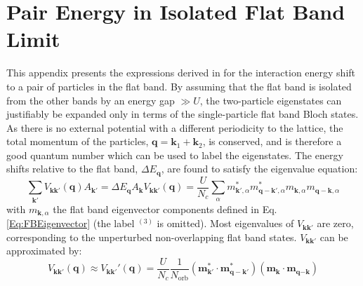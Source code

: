 \chapter{Pair Energy in Isolated Flat Band Limit}\label{App:Pair_Energy}

This appendix presents the expressions derived in \cite{Torma} for the interaction energy shift to a pair of particles in the flat band. By assuming that the flat band is isolated from the other bands by an energy gap $\gg U$, the two-particle eigenstates can justifiably be expanded only in terms of the single-particle flat band Bloch states. As there is no external potential with a different periodicity to the lattice, the total momentum of the particles, $\textbf{q}=\textbf{k}_1+\textbf{k}_2$, is conserved, and is therefore a good quantum number which can be used to label the eigenstates. The energy shifts relative to the flat band, $\Delta E_{\textbf{q}}$, are found to satisfy the eigenvalue equation:
\begin{subequations}\label{Eq:PairEnergy_Eigenvalue}
    \begin{equation}
        \sum_{\textbf{k}'}V_{\textbf{k}\textbf{k}'}(\textbf{q}) A_{\textbf{k}'}=\Delta E_{\textbf{q}}A_{\textbf{k}}
    \end{equation}
    \begin{equation}
        V_{\textbf{k}\textbf{k}'}(\textbf{q})=\frac{U}{N_c}\sum_{\alpha} m_{\textbf{k}',\alpha}^{*} m_{\textbf{q}-\textbf{k}',\alpha}^{*} m_{\textbf{k},\alpha} m_{\textbf{q}-\textbf{k},\alpha}
    \end{equation}
\end{subequations}
with $m_{\textbf{k},\alpha}$ the flat band eigenvector components defined in Eq. \ref{Eq:FBEigenvector} (the label $^{(3)}$ is omitted). Most eigenvalues of $V_{\textbf{k}\textbf{k}'}$ are zero, corresponding to the unperturbed non-overlapping flat band states. $V_{\textbf{k}\textbf{k}'}$ can be approximated by:
\begin{equation}\label{Eq:Approximate_Potential}
    V_{\textbf{k}\textbf{k}'}(\textbf{q})\approx V_{\textbf{k}\textbf{k}'}'(\textbf{q}) = \frac{U}{N_c}\frac{1}{N_{\text{orb}}} (\textbf{m}_{\textbf{k}'}^{*} \cdot \textbf{m}_{\textbf{q}-\textbf{k}'}^{*}) (\textbf{m}_{\textbf{k}} \cdot \textbf{m}_{\textbf{q}-\textbf{k}})
\end{equation}
